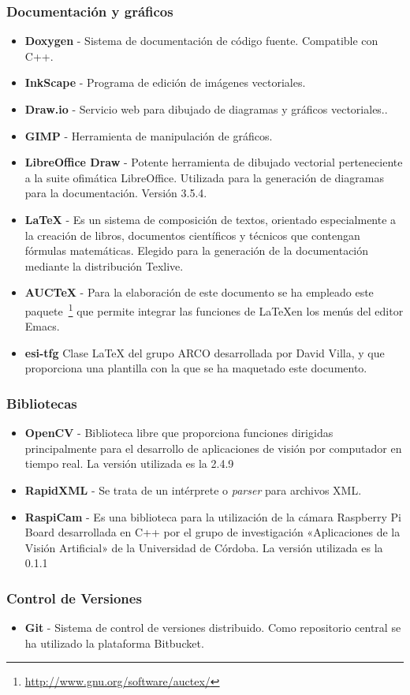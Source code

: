 \subsubsection{Documentación y gráficos}
\begin{itemize}
\item \textbf{Doxygen} - Sistema de documentación de código fuente. Compatible con C++.
\item \textbf{InkScape} - Programa de edición de imágenes vectoriales.
\item \textbf{Draw.io} - Servicio web para dibujado de diagramas y gráficos vectoriales..
\item \textbf{GIMP} - Herramienta de manipulación de gráficos.
\item \textbf{LibreOffice Draw} - Potente herramienta de dibujado vectorial perteneciente a la suite ofimática LibreOffice. Utilizada para la generación de diagramas para la documentación. Versión 3.5.4.
\item \textbf{\LaTeX{}} - Es un sistema de composición de textos, orientado especialmente a la creación de libros, documentos científicos y técnicos que contengan fórmulas matemáticas. Elegido para la generación de la documentación mediante la distribución Texlive. 
\item \textbf{AUCTeX} -  Para la elaboración de este documento se ha empleado este paquete~\footnote{\url{http://www.gnu.org/software/auctex/}} que permite integrar las funciones
  de \LaTeX en los menús del editor Emacs.
\item  \textbf{esi-tfg} Clase \LaTeX{} del grupo \acs{ARCO} desarrollada por David Villa, y que proporciona una plantilla con la que se ha maquetado este documento.
\end{itemize}


\subsubsection{Bibliotecas}
\begin{itemize}
\item \textbf{OpenCV} - Biblioteca libre que proporciona funciones dirigidas principalmente para el desarrollo de aplicaciones de visión por computador en tiempo real. La versión utilizada es la 2.4.9
\item \textbf{RapidXML} - Se trata de un intérprete o \textit{parser} para archivos XML.
\item \textbf{RaspiCam} - Es una biblioteca para la utilización de la cámara Raspberry Pi Board desarrollada en C++ por el grupo de investigación «Aplicaciones de la Visión Artificial» de la Universidad de Córdoba. La versión utilizada es la 0.1.1 
\end{itemize}

\subsubsection{Control de Versiones}
\begin{itemize}
\item \textbf{Git} - Sistema de control de versiones distribuido. Como repositorio central se ha utilizado la plataforma Bitbucket.
\end{itemize}
